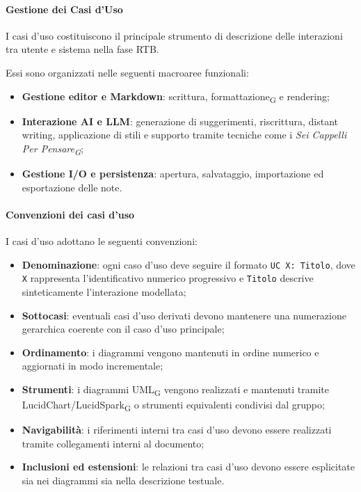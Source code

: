 \paragraph{Gestione dei Casi d'Uso}

I casi d'uso costituiscono il principale strumento di descrizione delle interazioni
tra utente e sistema nella fase RTB.

Essi sono organizzati nelle seguenti macroaree funzionali:

\begin{itemize}
    \item \textbf{Gestione editor e Markdown}: scrittura, formattazione\textsubscript{G} e rendering;

    \item \textbf{Interazione AI e LLM}: generazione di suggerimenti, riscrittura,
    distant writing, applicazione di stili e supporto tramite tecniche come i
    \textit{Sei Cappelli Per Pensare\textsubscript{G}};

    \item \textbf{Gestione I/O e persistenza}: apertura, salvataggio, importazione ed
    esportazione delle note.
\end{itemize}

\paragraph{Convenzioni dei casi d'uso}

I casi d'uso adottano le seguenti convenzioni:

\begin{itemize}
      \item \textbf{Denominazione}: ogni caso d'uso deve seguire il formato \texttt{UC X: Titolo}, dove \texttt{X} rappresenta l'identificativo numerico
      progressivo e \texttt{Titolo} descrive sinteticamente l'interazione modellata;

      \item \textbf{Sottocasi}: eventuali casi d'uso derivati devono mantenere una numerazione gerarchica coerente con il caso d'uso principale;
      
      \item \textbf{Ordinamento}: i diagrammi vengono mantenuti in ordine numerico e
      aggiornati in modo incrementale;

      \item \textbf{Strumenti}: i diagrammi UML\textsubscript{G} vengono realizzati e
      mantenuti tramite LucidChart/LucidSpark\textsubscript{G} o strumenti equivalenti condivisi dal
      gruppo;

      \item \textbf{Navigabilità}: i riferimenti interni tra casi d'uso devono essere
      realizzati tramite collegamenti interni al documento;

      \item \textbf{Inclusioni ed estensioni}: le relazioni tra casi d'uso devono essere
      esplicitate sia nei diagrammi sia nella descrizione testuale.
\end{itemize}

